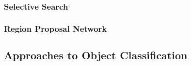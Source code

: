 \subsubsection{Selective Search}

\subsubsection{Region Proposal Network}

\subsection{Approaches to Object Classification}

                    
